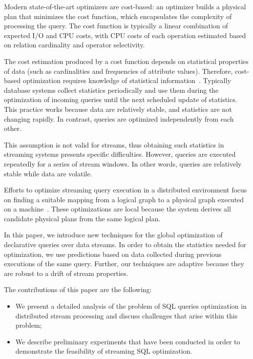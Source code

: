 Modern state-of-the-art optimizers are cost-based: an optimizer builds a physical plan that minimizes the cost function, which encapsulates the complexity of processing the query. 
The cost function is typically a linear combination of expected I/O and CPU costs, with CPU costs of each operation estimated based on relation cardinality and operator selectivity. 

The cost estimation produced by a cost function depends on statistical properties of data (such as cardinalities and frequencies of attribute values). Therefore, cost-based optimization requires knowledge of statistical information~\cite{Neumann2018optimization}.  
Typically database systems collect statistics periodically and use them during the optimization of incoming queries until the next scheduled update of statistics. 
This practice works because data are relatively stable, and statistics are not changing rapidly. In contrast, queries are optimized independently from each other. 

This assumption is not valid for streams, thus obtaining such statistics in streaming systems presents specific difficulties. However, queries are executed repeatedly for a series of stream windows. In other words, queries are relatively stable while data are volatile.

Efforts to optimize streaming query execution in a distributed environment focus on finding a suitable mapping from a logical graph to a physical graph executed on a machine~\cite{grulich2020grizzly, gedik2009code, kroll2019arc, schneider2012auto, gedik2008spade}.
These optimizations are local because the system derives all candidate physical plans from the same logical plan.  

In this paper, we introduce new techniques for the global optimization of declarative queries over data streams. 
In order to obtain the statistics needed for optimization, we use predictions based on data collected during previous executions of the same query. 
Further, our techniques are adaptive because they are robust to a drift of stream properties. 

The contributions of this paper are the following:
\begin{itemize}
    \item We present a detailed analysis of the problem of SQL queries optimization in distributed stream processing and discuss challenges that arise within this problem;
    \item We describe preliminary experiments that have been conducted in order to demonstrate the feasibility of streaming SQL optimization.
\end{itemize}

